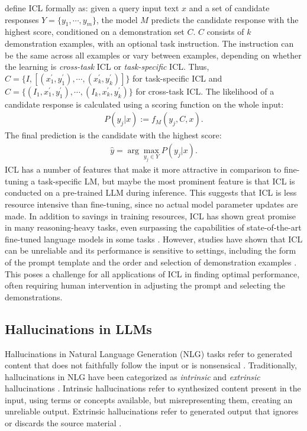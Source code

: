 \documentclass[english, 12pt, a4paper, sci, utf8, a-2b, online]{../definitions/aaltothesis}
\begin{document}
\textcite{dong-etal-2024-survey} define ICL formally as: given a query input text $x$ and a set of candidate responses $Y = \{y_1, \cdots, y_m\}$, the model $M$ predicts the candidate response with the highest score, conditioned on a demonstration set $C$. $C$ consists of $k$ demonstration examples, with an optional task instruction. The instruction can be the same across all examples or vary between examples, depending on whether the learning is \textit{cross-task} ICL or \textit{task-specific} ICL. Thus, $C = \{I, [(x_1^\prime, y_1^\prime), \cdots, (x_k^\prime, y_k^\prime)]\}$ for task-specific ICL and $C = \{(I_1, x_1^\prime, y_1^\prime), \cdots, (I_k, x_k^\prime, y_k^\prime)\}$ for cross-task ICL. The likelihood of a candidate response is calculated using a scoring function on the whole input:
\begin{align}
    P(y_j | x) := f_M(y_j, C, x).
\end{align}
The final prediction is the candidate with the highest score:
\begin{align}
    \hat{y} = \arg \max_{y_j \in Y}P(y_j|x).
\end{align}
ICL has a number of features that make it more attractive in comparison to fine-tuning a task-specific LM, but maybe the most prominent feature is that ICL is conducted on a pre-trained LLM during inference. This suggests that ICL is less resource intensive than fine-tuning, since no actual model parameter updates are made. In addition to savings in training resources, ICL has shown great promise in many reasoning-heavy tasks, even surpassing the capabilities of state-of-the-art fine-tuned language models in some tasks \cite{NEURIPS2020_1457c0d6}. However, studies have shown that ICL can be unreliable and its performance is sensitive to settings, including the form of the prompt template and the order and selection of demonstration examples \cite{wang2024largelanguagemodelslatent}. This poses a challenge for all applications of ICL in finding optimal performance, often requiring human intervention in adjusting the prompt and selecting the demonstrations.

\subsection{Hallucinations in LLMs} \label{sec:hallcinations}

Hallucinations in Natural Language Generation (NLG) tasks refer to generated content that does not faithfully follow the input or is nonsensical \cite{filippova-2020-controlled}. Traditionally, hallucinations in NLG have been categorized as \textit{intrinsic} and \textit{extrinsic} hallucinations \cite{maynez2020faithfulnessfactualityabstractivesummarization}. Intrinsic hallucinations refer to synthesized content present in the input, using terms or concepts available, but misrepresenting them, creating an unreliable output. Extrinsic hallucinations refer to generated output that ignores or discards the source material \cite{10.1145/3571730}.
\end{document}

